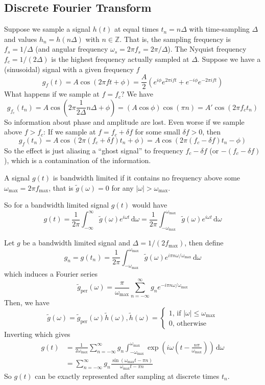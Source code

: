 \subsection{Discrete Fourier Transform}
Suppose we sample a signal $h(t)$ at equal times $t_n=n\Delta$ with time-sampling $\Delta$ and values $h_n=h(n\Delta)$ with $n\in\mathbb Z$.
That is, the sampling frequency is $f_s=1/\Delta$ (and angular frequency $\omega_s=2\pi f_s=2\pi/\Delta$).
The Nyquist frequency $f_c=1/(2\Delta)$ is the highest frequency actually sampled at $\Delta$.
Suppose we have a (sinusoidal) signal with a given frequency $f$
$$g_f(t)=A\cos(2\pi ft+\phi)=\frac{A}{2}(e^{i\phi}e^{2\pi ift}+e^{-i\phi}e^{-2\pi ift})$$
What happens if we sample at $f=f_c$?
We have
$$g_{f_c}(t_n)=A\cos\left( 2\pi\frac{1}{2\Delta}n\Delta+\phi \right)=(A\cos\phi)\cos(\pi n)=A'\cos(2\pi f_ct_n)$$
So information about phase and amplitude are lost.
Even worse if we sample above $f>f_c$:
If we sample at $f=f_c+\delta f$ for some small $\delta f>0$, then
$$g_f(t_n)=A\cos(2\pi(f_c+\delta f)t_n+\phi)=A\cos(2\pi(f_c-\delta f)t_n-\phi)$$
So the effect is just aliasing a ``ghost signal'' to frequency $f_c-\delta f$ (or $-(f_c-\delta f)$), which is a contamination of the information.
\begin{definition}
    A signal $g(t)$ is bandwidth limited if it contains no frequency above some $\omega_{\max{}}=2\pi f_{\max{}}$, that is $\tilde{g}(\omega)=0$ for any $|\omega|>\omega_{\max{}}$.
\end{definition}
So for a bandwidth limited signal $g(t)$ would have
$$g(t)=\frac{1}{2\pi}\int_{-\infty}^\infty\tilde{g}(\omega)e^{i\omega t}\,\mathrm d\omega=\frac{1}{2\pi}\int_{-\omega_{\max{}}}^{\omega_{\max{}}}\tilde{g}(\omega)e^{i\omega t}\,\mathrm d\omega$$
\begin{theorem}
    Let $g$ be a bandwidth limited signal and $\Delta=1/(2f_{\max{}})$, then define
    $$g_n=g(t_n)=\frac{1}{2\pi}\int_{-\omega_{\max{}}}^{\omega_{\max{}}}\tilde{g}(\omega)e^{i\pi n\omega/\omega_{\max{}}}\,\mathrm d\omega$$
    which induces a Fourier series
    $$\tilde{g}_{\mathrm{per}}(\omega)=\frac{\pi}{\omega_{\max{}}}\sum_{n=-\infty}^\infty g_ne^{-i\pi n\omega/\omega_{\max{}}}$$
    Then, we have
    $$\tilde{g}(\omega)=\tilde{g}_{\mathrm{per}}(\omega)\tilde{h}(\omega),\tilde{h}(\omega)=\begin{cases}
        1\text{, if $|\omega|\le\omega_{\max{}}$}\\
        0\text{, otherwise}
    \end{cases}$$
    Inverting which gives
    \begin{align*}
        g(t)&=\frac{1}{2\omega_{\max{}}}\sum_{n=-\infty}^\infty g_n\int_{-\omega_{\max{}}}^{\omega_{\max{}}}\exp\left( i\omega\left( t-\frac{n\pi}{\omega_{\max{}}} \right) \right)\,\mathrm d\omega\\
        &=\sum_{n=-\infty}^\infty g_n\frac{\sin(\omega_{\max{}} t-\pi n)}{\omega_{\max{}} t-\pi n}
    \end{align*}
    So $g(t)$ can be exactly represented after sampling at discrete times $t_n$.
\end{theorem}
